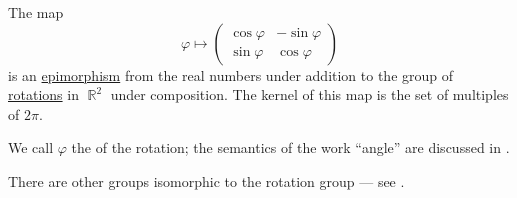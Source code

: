 \begin{proposition}\label{thm:plane_rotation_matrix}
  The map
  \begin{equation}\label{eq:thm:plane_rotation_matrix}
    \varphi
    \mapsto
    \begin{pmatrix}
      \cos \varphi & -\sin \varphi \\
      \sin \varphi & \cos \varphi
    \end{pmatrix}
  \end{equation}
  is an \hyperref[def:morphism_invertibility/right_cancellative]{epimorphism} from the real numbers under addition to the group of \hyperref[def:rigid_motion/rotation]{rotations} in \( \BbbR^2 \) under composition. The kernel of this map is the set of multiples of \( 2\pi \).

  We call \( \varphi \) the  of the rotation; the semantics of the work \enquote{angle} are discussed in .

  There are other groups isomorphic to the rotation group --- see .
\end{proposition}
